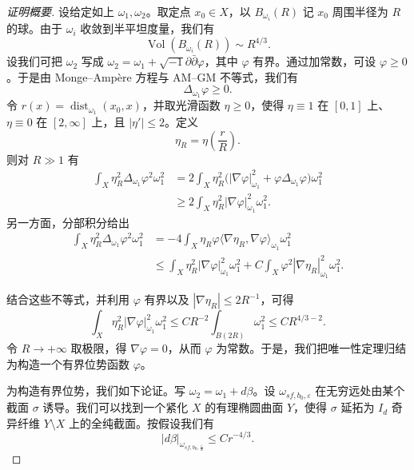 \begin{proof}[证明概要]
设给定如上 $\omega_1,\omega_2$。取定点 $x_0\in X$，以 $B_{\omega_i}(R)$ 记 $x_0$ 周围半径为 $R$ 的球。由于 $\omega_i$ 收敛到半平坦度量，我们有
\[
\operatorname{Vol}(B_{\omega_i}(R))\sim R^{4/3}.
\]
设我们可把 $\omega_2$ 写成 $\omega_2=\omega_1+\sqrt{-1}\partial\bar\partial\varphi$，其中 $\varphi$ 有界。通过加常数，可设 $\varphi\ge0$。于是由 Monge--Ampère 方程与 AM--GM 不等式，我们有
\[
\Delta_{\omega_1}\varphi\ge0.
\]
令 $r(x)=\operatorname{dist}_{\omega_1}(x_0,x)$，并取光滑函数 $\eta\ge0$，使得 $\eta\equiv1$ 在 $[0,1]$ 上、$\eta\equiv0$ 在 $[2,\infty]$ 上，且 $|\eta'|\le2$。定义
\[
\eta_R=\eta\left(\frac rR\right).
\]
则对 $R\gg1$ 有
\begin{align*}
\int_X\eta_R^2\Delta_{\omega_1}\varphi^2\omega_1^2
&=2\int_X\eta_R^2\bigl(|\nabla\varphi|^2_{\omega_1}+\varphi\Delta_{\omega_1}\varphi\bigr)\omega_1^2\\
&\ge2\int_X\eta_R^2|\nabla\varphi|^2_{\omega_1}\omega_1^2.
\end{align*}
另一方面，分部积分给出
\begin{align*}
\int_X\eta_R^2\Delta_{\omega_1}\varphi^2\omega_1^2
&=-4\int_X\eta_R\varphi\langle\nabla\eta_R,\nabla\varphi\rangle_{\omega_1}\omega_1^2\\
&\le\int_X\eta_R^2|\nabla\varphi|^2_{\omega_1}\omega_1^2+C\int_X\varphi^2|\nabla\eta_R|^2_{\omega_1}\omega_1^2.
\end{align*}

结合这些不等式，并利用 $\varphi$ 有界以及 $|\nabla\eta_R|\le2R^{-1}$，可得
\[
\int_X\eta_R^2|\nabla\varphi|^2_{\omega_1}\omega_1^2\le CR^{-2}\int_{B(2R)}\omega_1^2\le CR^{4/3-2}.
\]
令 $R\to+\infty$ 取极限，得 $\nabla\varphi=0$，从而 $\varphi$ 为常数。于是，我们把唯一性定理归结为构造一个有界位势函数 $\varphi$。

为构造有界位势，我们如下论证。写 $\omega_2=\omega_1+d\beta$。设 $\omega_{sf,b_0,\varepsilon}$ 在无穷远处由某个截面 $\sigma$ 诱导。我们可以找到一个紧化 $X$ 的有理椭圆曲面 $Y$，使得 $\sigma$ 延拓为 $I_d$ 奇异纤维 $Y\setminus X$ 上的全纯截面。按假设我们有
\begin{equation}
|d\beta|_{\omega_{sf,b_0,\frac{\varepsilon}{\alpha}}}\le Cr^{-4/3}. \tag{6.5.2}
\end{equation}


\end{proof}
